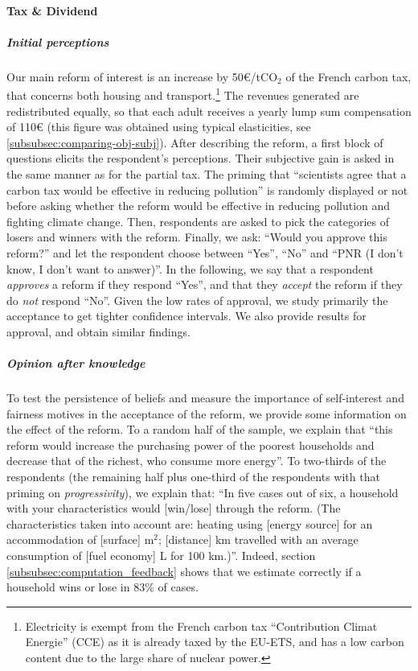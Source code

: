 \documentclass[11pt]{article}
\begin{document}
\paragraph{Tax \& Dividend}


\subparagraph{Initial perceptions}

Our main reform of interest is an increase by 50\euro{}/t$\text{CO}_{2}$ of the French carbon tax, that concerns both housing and transport.\footnote{Electricity is exempt from the French carbon tax ``Contribution Climat Energie'' (CCE) as it is already taxed by the EU-ETS, and has a low carbon content due to the large share of nuclear power.} The revenues generated are redistributed equally, so that each adult receives a yearly lump sum compensation of 110\euro{} (this figure was obtained using typical elasticities, see \ref{subsubsec:comparing-obj-subj}). After describing the reform, a first block of questions elicits the respondent's perceptions. Their subjective gain is asked in the same manner as for the partial tax. The priming that ``scientists agree that a carbon tax would be effective in reducing pollution'' is randomly displayed or not before asking whether the reform would be effective in reducing pollution and fighting climate change. Then, respondents are asked to pick the categories of losers and winners with the reform. Finally, we ask: ``Would you approve this reform?'' and let the respondent choose between ``Yes'', ``No'' and ``PNR (I don't know, I don't want to answer)''. In the following, we say that a respondent \emph{approves }a reform if they respond ``Yes'', and that they \emph{accept} the reform if they do \emph{not} respond ``No''. Given the low rates of approval, we study primarily the acceptance to get tighter confidence intervals. We also provide results for approval, and obtain similar findings.

\subparagraph{Opinion \emph{after knowledge}}
To test the persistence of beliefs and measure the importance of self-interest and fairness motives in the acceptance of the reform, we provide some information on the effect of the reform. To a random half of the sample, we explain that ``this reform would increase the purchasing power of the poorest households and decrease that of the richest, who consume more energy''. To two-thirds of the respondents (the remaining half plus one-third of the respondents with that priming on \emph{progressivity}), we explain that: ``In five cases out of six, a household with your characteristics would {[}win/lose{]} through the reform. (The characteristics taken into account are: heating using {[}energy source{]} for an accommodation of {[}surface{]} m$^{2}$; {[}distance{]} km travelled with an average consumption of {[}fuel economy{]} L for 100 km.)''. Indeed, section \ref{subsubsec:computation_feedback} shows that we estimate correctly if a household wins or lose in 83\% of cases. 
\end{document}
